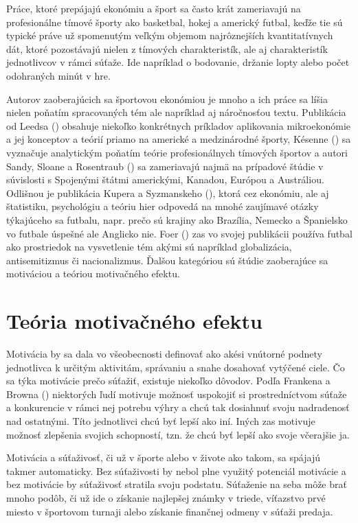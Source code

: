 \documentclass[
  digital, %
  oneside, %
  notable,   %
  lof,     %
  lot,     %
]{fithesis3}
\begin{document}
	Práce, ktoré prepájajú ekonómiu a šport sa často krát zameriavajú na profesionálne tímové športy ako basketbal, hokej a americký futbal, keďže tie sú typické práve už spomenutým veľkým objemom najrôznejších kvantitatívnych dát, ktoré pozostávajú nielen z tímových charakteristík, ale aj charakteristík jednotlivcov v rámci súťaže. Ide napríklad o bodovanie, držanie lopty alebo počet odohraných minút v hre.
	
	Autorov zaoberajúcich sa športovou ekonómiou je mnoho a ich práce sa líšia nielen poňatím spracovaných tém ale napríklad aj náročnosťou textu. Publikácia od Leedsa (\citeyear{leeds2018}) obsahuje niekoľko konkrétnych príkladov aplikovania mikroekonómie a jej konceptov a teórií priamo na americké a medzinárodné športy, Késenne (\citeyear{kesenne2014}) sa vyznačuje analytickým poňatím teórie profesionálnych tímových športov a autori Sandy, Sloane a Rosentraub (\citeyear{sandy2004}) sa zameriavajú najmä na prípadové štúdie v súvislosti s Spojenými štátmi americkými, Kanadou, Európou a Austráliou. Odlišnou je publikácia Kupera a Syzmanskeho (\citeyear{kuper2009}), ktorá cez ekonómiu, ale aj štatistiku, psychológiu a teóriu hier odpovedá na mnohé zaujímavé otázky týkajúceho sa futbalu, napr. prečo sú krajiny ako Brazília, Nemecko a Španielsko vo futbale úspešné ale Anglicko nie. Foer (\citeyear{foer2004}) zas vo svojej publikácii používa futbal ako prostriedok na vysvetlenie tém akými sú napríklad globalizácia, antisemitizmus či nacionalizmus. Ďalšou kategóriou sú štúdie zaoberajúce sa motiváciou a teóriou motivačného efektu.
	
		\section{Teória motivačného efektu}
		Motivácia by sa dala vo všeobecnosti definovať ako akési vnútorné podnety jednotlivca k určitým aktivitám, správaniu a snahe dosahovať vytýčené ciele. Čo sa týka motivácie prečo súťažiť, existuje niekoľko dôvodov. Podľa Frankena a Browna (\citeyear{franken1995}) niektorých ľudí motivuje možnosť uspokojiť si prostredníctvom súťaže a konkurencie v rámci nej potrebu výhry a chcú tak dosiahnuť svoju nadradenosť nad ostatnými. \parencite{nicholls1989} Títo jednotlivci chcú byť lepší ako iní. Iných zas motivuje možnosť zlepšenia svojich schopností, tzn. že chcú byť lepší ako svoje včerajšie ja.
		
		Motivácia a súťaživosť, či už v športe alebo v živote ako takom, sa spájajú takmer automaticky. Bez súťaživosti by nebol plne využitý potenciál motivácie a bez motivácie by súťaživosť stratila svoju podstatu. Súťaženie na seba môže brať mnoho podôb, či už ide o získanie najlepšej známky v triede, víťazstvo prvé miesto v športovom turnaji alebo získanie finančnej odmeny v súťaži predaja. \parencite{tauer1999}
		
\end{document}
